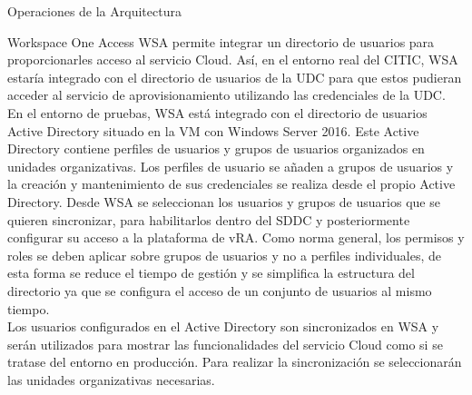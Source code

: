 \begin{subsection}{Operaciones de la Arquitectura}


    \begin{subsubsection}{Workspace One Access}
        \label{subsubsec:WSA}
        WSA permite integrar un directorio de usuarios para proporcionarles acceso al servicio Cloud. Así, en el entorno real del CITIC, WSA estaría integrado con el directorio de usuarios de la UDC para que estos pudieran acceder al servicio de aprovisionamiento utilizando las credenciales de la UDC.\\
        En el entorno de pruebas, WSA está integrado con el directorio de usuarios Active Directory situado en la VM con Windows Server 2016. Este Active Directory contiene perfiles de usuarios y grupos de usuarios organizados en unidades organizativas. Los perfiles de usuario se añaden a grupos de usuarios y la creación y mantenimiento de sus credenciales se realiza desde el propio Active Directory. Desde WSA se seleccionan los usuarios y grupos de usuarios que se quieren sincronizar, para habilitarlos dentro del SDDC y posteriormente configurar su acceso a la plataforma de vRA. Como norma general, los permisos y roles se deben aplicar sobre grupos de usuarios y no a perfiles individuales, de esta forma se reduce el tiempo de gestión y se simplifica la estructura del directorio ya que se configura el acceso de un conjunto de usuarios al mismo tiempo.\\
        Los usuarios configurados en el Active Directory son sincronizados en WSA y serán utilizados para mostrar las funcionalidades del servicio Cloud como si se tratase del entorno en producción. Para realizar la sincronización se seleccionarán las unidades organizativas necesarias.
        

\end{subsubsection}
\end{subsection}
